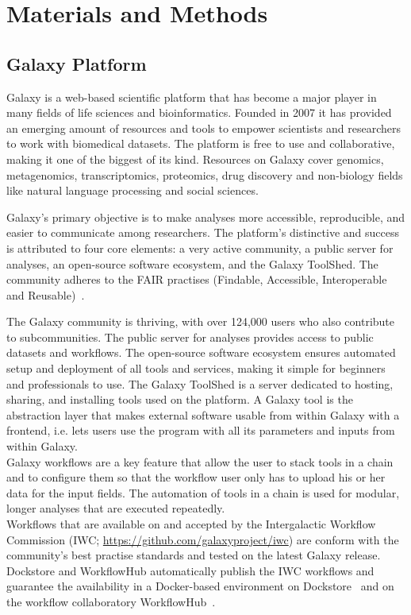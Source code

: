 \chapter{Materials and Methods}\label{chap:methods}
\todoit

\section{Galaxy Platform}\label{sec:galaxy}
Galaxy is a web-based scientific platform that has become a major player in many fields of life sciences and bioinformatics. Founded in 2007 it has provided an emerging amount of resources and tools to empower scientists and researchers to work with biomedical datasets. The platform is free to use and collaborative, making it one of the biggest of its kind. Resources on Galaxy cover genomics, metagenomics, transcriptomics, proteomics, drug discovery and non-biology fields like natural language processing and social sciences.

Galaxy's primary objective is to make analyses more accessible, reproducible, and easier to communicate among researchers. The platform's distinctive and success is attributed to four core elements: a very active community, a public server for analyses, an open-source software ecosystem, and the Galaxy ToolShed. The community adheres to the FAIR practises (Findable, Accessible, Interoperable and Reusable)~\cite{10.1093/nar/gkac247}.

The Galaxy community is thriving, with over 124,000 users who also contribute to subcommunities. The public server for analyses provides access to public datasets and workflows. The open-source software ecosystem ensures automated setup and deployment of all tools and services, making it simple for beginners and professionals to use. The Galaxy ToolShed is a server dedicated to hosting, sharing, and installing tools used on the platform. A Galaxy tool is the abstraction layer that makes external software usable from within Galaxy with a frontend, i.e. lets users use the program with all its parameters and inputs from within Galaxy. \\ 
Galaxy workflows are a key feature that allow the user to stack tools in a chain and to configure them so that the workflow user only has to upload his or her data for the input fields. The automation of tools in a chain is used for modular, longer analyses that are executed repeatedly. \\
Workflows that are available on and accepted by the Intergalactic Workflow Commission (IWC; \url{https://github.com/galaxyproject/iwc}) are conform with the community's best practise standards and tested on the latest Galaxy release. Dockstore and WorkflowHub automatically publish the \acs{IWC} workflows and guarantee the availability in a Docker-based environment on Dockstore~\cite{o2017dockstore} and on the workflow collaboratory WorkflowHub~\cite{goble2021implementing}.

